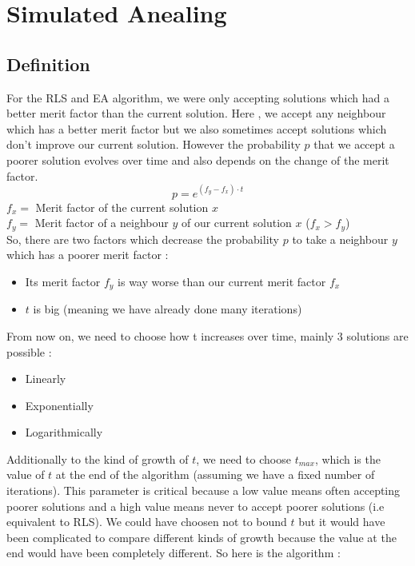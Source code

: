 \documentclass[a4paper,11pt,openany]{article}
\begin{document}
\section{Simulated Anealing}
\subsection{Definition}
\noindent
For the RLS and EA algorithm, we were only accepting solutions which had a better merit factor than the current solution. Here \cite{sa}, we accept any neighbour which has a better merit factor but we also sometimes accept solutions which don't improve our current solution. However the probability $p$ that we accept a poorer solution evolves over time and also depends on the change of the merit factor.
\begin{equation}
p=e^{(f_y-f_x)\cdot t}
\end{equation}
$f_x=$ Merit factor of the current solution $x$\\
$f_y=$ Merit factor of a neighbour $y$ of our current solution $x$ ($f_x>f_y$)\\
So, there are two factors which decrease the probability $p$ to take a neighbour $y$ which has a poorer merit factor :
\begin{itemize}
\item Its merit factor $f_y$ is way worse than our current merit factor $f_x$
\item $t$ is big (meaning we have already done many iterations)
\end{itemize} 
From now on, we need to choose how t increases over time, mainly 3 solutions are possible :
\begin{itemize}
\item Linearly
\item Exponentially
\item Logarithmically
\end{itemize}
Additionally to the kind of growth of $t$, we need to choose $t_{max}$, which is the value of $t$ at the end of the algorithm (assuming we have a fixed number of iterations). This parameter is critical because a low value means often accepting poorer solutions and a high value means never  to accept poorer solutions (i.e equivalent to RLS). We could have choosen not to bound $t$ but it would have been complicated to compare different kinds of growth because the value at the end would have been completely different. So here is the algorithm :
\end{document}
